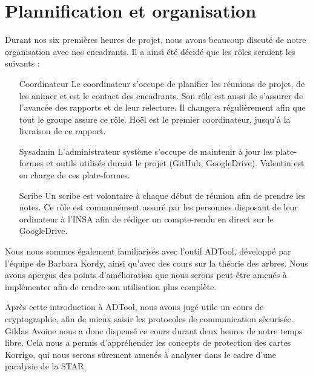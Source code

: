 \chapter{Plannification et organisation}

	Durant nos six premières heures de projet, nous avons beaucoup discuté de notre organisation avec nos encadrants. Il a ainsi été décidé que les rôles seraient les suivants :\newline{}
	\begin{itemize}
		\item[Coordinateur] Le coordinateur s'occupe de planifier les réunions de projet, de les animer et est le contact des encadrants. Son rôle est aussi de s'assurer de l'avancée des rapports et de leur relecture. Il changera régulièrement afin que tout le groupe assure ce rôle. Hoël est le premier coordinateur, jusqu'à la livraison de ce rapport.\newline{}
		\item[Sysadmin] L'administrateur système s'occupe de maintenir à jour les plate-formes et outils utilisés durant le projet (GitHub, GoogleDrive). Valentin est en charge de ces plate-formes.\newline{}
		\item[Scribe] Un scribe est volontaire à chaque début de réunion afin de prendre les notes. Ce rôle est communément assuré par les personnes disposant de leur ordinateur à l'INSA afin de rédiger un compte-rendu en direct sur le GoogleDrive.\newline{}
	\end{itemize}


	Nous nous sommes également familiarisés avec l'outil ADTool, développé par l'équipe de Barbara Kordy, ainsi qu'avec des cours sur la théorie des arbres. Nous avons aperçus des points d'amélioration que nous serons peut-être amenés à implémenter afin de rendre son utilisation plus complète.
	
	Après cette introduction à ADTool, nous avons jugé utile un cours de cryptographie, afin de mieux saisir les protocoles de communication sécurisée. Gildas Avoine nous a donc dispensé ce cours durant deux heures de notre temps libre. Cela nous a permis d'appréhender les concepts de protection des cartes Korrigo, qui nous serons sûrement amenés à analyser dans le cadre d'une paralysie de la STAR.